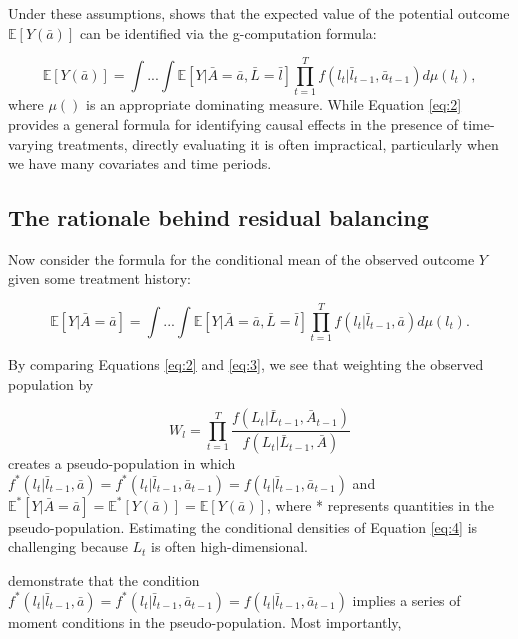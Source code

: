 Under these assumptions, \citet{robinsNewApproachCausal1986} shows that
the expected value of the potential outcome \(\mathbb{E}[Y(\bar{a})]\)
can be identified via the g-computation formula:

\begin{equation}
\label{eq:2}
\mathbb{E}[Y(\bar{a})]=\int...\int\mathbb{E}[Y|\bar{A}=\bar{a}, \bar{L}=\bar{l}]\prod^{T}_{t=1}f(l_{t}|\bar{l}_{t-1},\bar{a}_{t-1})d\mu(l_{t}),
\end{equation}
where \(\mu()\) is an appropriate dominating measure. While Equation
\ref{eq:2} provides a general formula for identifying causal effects in
the presence of time-varying treatments, directly evaluating it is often
impractical, particularly when we have many covariates and time periods.

\hypertarget{rbw-panel}{%
\subsection{The rationale behind residual balancing}\label{rbw-panel}}

Now consider the formula for the conditional mean of the observed
outcome \(Y\) given some treatment history:

\begin{equation}
\label{eq:3}
\mathbb{E}[Y|\bar{A}=\bar{a}]=\int...\int\mathbb{E}[Y|\bar{A}=\bar{a}, \bar{L}=\bar{l}]\prod^{T}_{t=1}f(l_{t}|\bar{l}_{t-1},\bar{a})d\mu(l_{t}).
\end{equation}

By comparing Equations \ref{eq:2} and \ref{eq:3}, we see that weighting
the observed population by

\begin{equation}
\label{eq:4}
W_{l}=\prod^{T}_{t=1}\frac{f(L_{t}|\bar{L}_{t-1},\bar{A}_{t-1})}{f(L_{t}|\bar{L}_{t-1},\bar{A})}
\end{equation}
creates a pseudo-population in which
\(f^{*}(l_{t}|\bar{l}_{t-1},\bar{a})=f^{*}(l_{t}|\bar{l}_{t-1},\bar{a}_{t-1})=f(l_{t}|\bar{l}_{t-1},\bar{a}_{t-1})\)
and
\(\mathbb{E}^{*}[Y|\bar{A}=\bar{a}]=\mathbb{E}^{*}[Y(\bar{a})]=\mathbb{E}[Y(\bar{a})]\),
where * represents quantities in the pseudo-population. Estimating the
conditional densities of Equation \ref{eq:4} is challenging because
\(L_{t}\) is often high-dimensional.

\sloppy \citet{zhouResidualBalancingMethod2020a} demonstrate that the
condition
\(f^{*}(l_{t}|\bar{l}_{t-1},\bar{a})=f^{*}(l_{t}|\bar{l}_{t-1},\bar{a}_{t-1})=f(l_{t}|\bar{l}_{t-1},\bar{a}_{t-1})\)
implies a series of moment conditions in the pseudo-population. Most
importantly,

